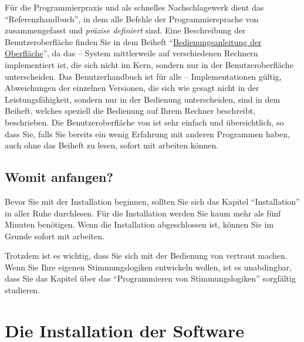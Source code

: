 Für die Programmierpraxis und als schnelles Nachschlagewerk dient das
"`Referenzhandbuch"', in dem alle Befehle der
Programmiersprache von \mutabor{}
zusammengefasst und \emph{präzise definiert} sind.  Eine Beschreibung
der Benutzeroberfläche finden Sie in dem Beiheft
"`\href{\makefilename{bedienung}}{Bedienungsanleitung der
  Oberfläche}"', da das \mutabor{} --
System mittlerweile auf verschiedenen Rechnern implementiert ist, die
sich nicht im Kern, sondern nur in der Benutzeroberfläche
unterscheiden. Das Benutzerhandbuch ist für alle \mutabor{} --
Implementationen gültig, Abweichungen der einzelnen Versionen, die
sich wie gesagt nicht in der Leistungsfähigkeit, sondern nur in der
Bedienung unterscheiden, sind in dem Beiheft, welches speziell die
Bedienung auf Ihrem Rechner beschreibt, beschrieben. Die
Benutzeroberfläche von \mutabor{} ist sehr einfach und übersichtlich,
so dass Sie, falls Sie bereits ein wenig Erfahrung mit anderen
Programmen haben, auch ohne das Beiheft zu lesen, sofort mit
\mutabor{} arbeiten können.

\section{Womit anfangen?}\label{sec:womit-anfangen-}

\iffalse
\index{Originaldisketten} Als allererstes sollten Sie eine Kopie der
Originaldiskette an\-fer\-ti\-gen\footnote{Das Kopieren von Disketten
  ist im Handbuch des Computers beschrieben.} und die Originaldiskette
danach an einem sicheren Platz verwahren. Wir machen Sie nochmals
darauf aufmerksam, dass die Weitergabe der Software und/oder der
Dokumentation an Dritte von uns strafrechtlich verfolgt wird.

\emph{Arbeiten Sie nur mit Kopien.
Sie riskieren sonst den Verlust Ihrer ganzen Daten.}
\fi

Bevor Sie mit der Installation beginnen, sollten Sie sich das
Kapitel "`Installation"' in aller Ruhe durchlesen. Für die
Installation werden Sie kaum mehr als fünf Minuten benötigen. Wenn
die Installation abgeschlossen ist, können Sie im Grunde sofort
mit \mutabor{} arbeiten.

Trotzdem ist es wichtig, dass Sie sich mit der Bedienung von
\mutabor{} vertraut machen. Wenn Sie Ihre eigenen
Stimmungslogiken entwickeln wollen, ist es unabdingbar, dass Sie
das Kapitel über das "`Programmieren von Stimmungslogiken"'
sorgfältig studieren.


\chapter{Die Installation der Software}\label{cha:die-installation-der}

